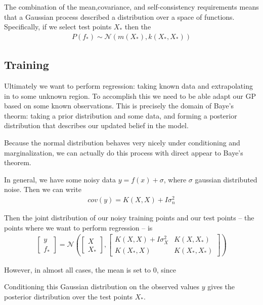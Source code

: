 \documentclass[10pt]{article}
\newcommand{\Normal}[2]{\mathcal{N}\left( #1 , #2 \right)}
\theoremstyle{definition}
\begin{document}
The combination of the mean,covariance, and self-consistency requirements means that a Gaussian process described a distribution over a space of functions. Specifically, if we select test points $X_{*}$ then the
\begin{align}
  P(f_{*}) \sim \Normal{m(X_{*})}{k(X_{*},X_{*})}
\end{align}

\subsection{Training}

Ultimately we want to perform regression: taking known data and extrapolating in to some unknown region.
To accomplish this we need to be able adapt our GP based on some known observations.
This is precisely the domain of Baye's theorm: taking a prior distribution and some data, and forming a posterior distribution that describes our updated belief in the model.

Because the normal distribution behaves very nicely under conditioning and marginalization, we can actually do this process with direct appear to Baye's theorem.

In general, we have some noisy data $y = f(x) + \sigma$, where $\sigma$ gaussian distributed noise.
Then we can write
\begin{align}
  cov(y) = K(X,X) + I \sigma_n^{2}
\end{align}

Then the joint distribution of our noisy training points and our test points -- the points where we want to perform regression -- is
\begin{align}
  \label{}
  \begin{bmatrix}
    y \\
    f_{*}  
  \end{bmatrix}
  =
  \Normal{
  \begin{bmatrix}
    X \\
    X_{*}
  \end{bmatrix}
  }{
  \begin{bmatrix}
    K(X,X) + I \sigma_X^2 & K(X, X_{*}) \\
    K(X_{*},X)  & K(X_{*}, X_{*}) 
  \end{bmatrix}
  }
\end{align}

However, in almost all cases, the mean is set to 0, since 

Conditioning this Gaussian distribution on the observed values $y$ gives the posterior distribution over the test points $X_{*}$. 
\end{document}
